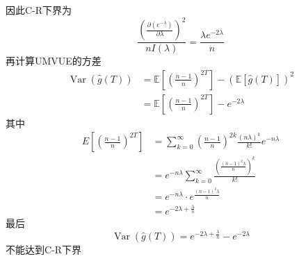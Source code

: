 \documentclass[UTF8,openany]{book}
\begin{document}
	因此C-R下界为
	\[
	\frac{\left( \frac{\partial\left(e^{-\lambda}\right)}{\partial \lambda}\right)^2}{n I(\lambda)}=\frac{\lambda e^{-2 \lambda}}{n} 
	\]
	再计算UMVUE的方差
	\[
	\begin{aligned}
		\operatorname{Var}(\hat{g}(T) ) & =\mathbb{E}\left[\left(\frac{n-1}{n}\right)^{2 T}\right]-(\mathbb{E}[\hat{g}(T)])^2 \\
		& =\mathbb{E}\left[\left(\frac{n-1}{n}\right)^{2 T}\right]-e^{-2 \lambda}
	\end{aligned}
	\]
	其中
	\[
	\begin{aligned}
		E\left[\left(\frac{n-1}{n}\right)^{2 T}\right] & =\sum_{k=0}^{\infty}\left(\frac{n-1}{n}\right)^{2 k} \frac{(n \lambda)^k}{k!} e^{-n \lambda} \\
		& =e^{-n \lambda} \sum_{k=0}^{\infty} \frac{\left( \frac{(n-1)^2 \lambda}{ n}\right) ^k}{k!}\\
		& =e^{-n \lambda} \cdot e^{\frac{(n-1)^2 \lambda}{n}} \\
		& =e^{-2 \lambda+\frac{\lambda}{n}}
	\end{aligned}
	\]
	最后
	\[
	\operatorname{Var}(\hat{g}(T))=e^{-2 \lambda+\frac{\lambda}{n}}-e^{-2 \lambda}
	\]
	不能达到C-R下界\\
	
\end{document}
